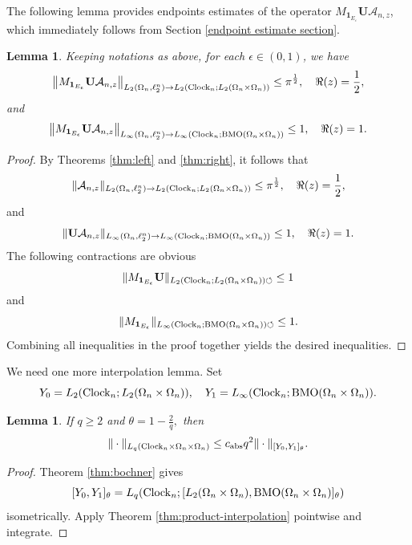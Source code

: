 \documentclass{amsart}
\numberwithin{equation}{section}
\newtheorem{lem}[thm]{Lemma}
\theoremstyle{definition}
\theoremstyle{remark}
\newcommand{\1}{\mathbf 1}
\newcommand{\BMO}{\mathrm{BMO}}
\begin{document}
The following lemma provides endpoints estimates of the operator $M_{\1_{E_{\varepsilon}}}\mathbf{U}\mathcal{A}_{n,z}$, which immediately follows from Section \ref{endpoint estimate section}.

\begin{lem}\label{final boundedness lemma} 
Keeping notations as above, for each $\epsilon\in (0,1)$, we have
$$\left\|M_{\1_{E_{\epsilon}}}\mathbf{U}\mathcal{A}_{n,z}\right\|_{L_2(\Omega_n,\ell^{n}_{2})\to L_2({\rm Clock}_n;L_2(\Omega_n\times\Omega_n))}\leq\pi^{\frac{1}{2}},\quad \Re(z)=\frac12,$$
and
$$\left\|M_{\1_{E_{\epsilon}}}\mathbf{U}\mathcal{A}_{n,z}\right\|_{L_{\infty}(\Omega_n,\ell^{n}_{2})\to L_{\infty}({\rm Clock}_n;\BMO(\Omega_n\times\Omega_n))}\leq 1,\quad \Re(z)=1.$$
\end{lem}
\begin{proof} By Theorems \ref{thm:left} and \ref{thm:right}, it follows that
$$\|\mathcal{A}_{n,z}\|_{L_2(\Omega_n,\ell^{n}_{2})\to L_2({\rm Clock}_n;L_2(\Omega_n\times\Omega_n))}\leq\pi^{\frac12},\quad \Re(z)=\frac{1}{2},$$
and
$$\|\mathbf{U}\mathcal{A}_{n,z}\|_{L_{\infty}(\Omega_n,\ell^{n}_{2})\to L_{\infty}({\rm Clock}_n;\BMO(\Omega_n\times\Omega_n))}\leq 1,\quad \Re(z)=1.$$
The following contractions are obvious
$$\|M_{\1_{E_{\epsilon}}}\mathbf{U}\|_{L_2({\rm Clock}_n;L_2(\Omega_n\times\Omega_n))\circlearrowleft}\leq 1$$
and
$$\|M_{\1_{E_{\epsilon}}}\|_{L_{\infty}({\rm Clock}_n;\BMO(\Omega_n\times\Omega_n))\circlearrowleft}\leq 1.$$
Combining all inequalities in the proof together yields the desired inequalities.
\end{proof}

We need one more interpolation lemma.
Set
$$Y_0=L_2({\rm Clock}_n;L_2(\Omega_n\times\Omega_n)),\quad Y_1=L_{\infty}({\rm Clock}_n;\BMO(\Omega_n\times\Omega_n)).$$

\begin{lem}\label{cor:clock-interpolation}
If $q\geq 2$ and $\theta=1-\frac{2}{q},$ then
\begin{equation}\label{eq:clock-interpolation-embedding}
\|\cdot\|_{L_q({\rm Clock}_n\times \Omega_n\times\Omega_n)}\leq c_{{\rm abs}}q^2\|\cdot\|_{[Y_0,Y_1]_{\theta}}.
\end{equation}
\end{lem}
\begin{proof} Theorem \ref{thm:bochner} gives
$$[Y_0,Y_1]_{\theta}=L_q({\rm Clock}_n;[L_2(\Omega_n\times\Omega_n),\BMO(\Omega_n\times\Omega_n)]_{\theta})$$
isometrically.  Apply Theorem \ref{thm:product-interpolation} pointwise and
integrate.
\end{proof}
\end{document}
